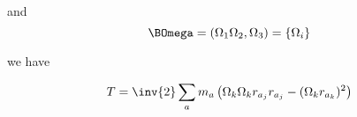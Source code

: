 and 
\begin{equation}\label{eqn:rigidBodyMotion:480}
\BOmega = ( \Omega_{1} \Omega_{2}, \Omega_{3} ) = \{ \Omega_{i} \}
\end{equation}

we have

\begin{equation}\label{eqn:rigidBodyMotion:500}
T = \inv{2} \sum_a m_a \left( \Omega_k \Omega_k r_{a_j} r_{a_j} - (\Omega_k r_{a_k})^2
\right)
\end{equation}

\EndNoBibArticle
